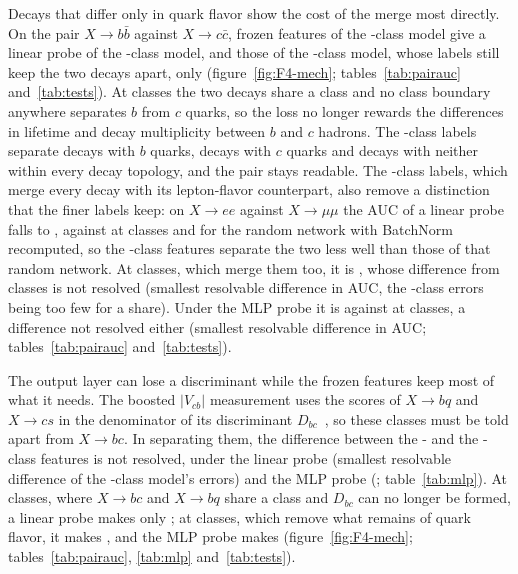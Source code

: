 Decays that differ only in quark flavor show the cost of the merge most directly. On the pair
$X\to b\bar b$ against $X\to c\bar c$, frozen features of the \Kcoarse-class model give a linear probe
\MlstCmpBbCoarseOverFullPr{} of the \Kfull-class model, and those of the \Kmid-class model, whose labels still
keep the two decays apart, only \MlstCmpBbMidOverFullPr{} (figure~\ref{fig:F4-mech}; tables~\ref{tab:pairauc} and~\ref{tab:tests}). At
\Kcoarse{} classes the two decays share a class and no class boundary anywhere separates $b$ from $c$ quarks, so
the loss no longer rewards the differences in lifetime and decay multiplicity between $b$ and $c$ hadrons. The
\Kmid-class labels separate decays with $b$ quarks, decays with $c$ quarks and decays with neither within every
decay topology, and the pair stays readable.
The \Kmid-class labels, which merge every decay with its lepton-flavor counterpart, also remove a distinction
that the finer labels keep: on $X\to ee$ against $X\to\mu\mu$ the AUC of a linear probe falls to
\MlstLpEemmAucMid{}, against \MlstLpEemmAucFull{} at \Kfull{} classes and \MlstLpEemmAucInitBn{} for the
random network with BatchNorm recomputed, so the \Kmid-class features separate the two less well than those of that
random network. At \Kcoarse{} classes, which merge them too, it is \MlstLpEemmAucCoarse{},
whose difference from \Kfull{} classes is not resolved (smallest resolvable difference \MlstPwEeCoarse{} in AUC,
the \Kfull-class errors being too few for a share). Under the MLP probe it is \MlstMlpEemmAucCoarse{} against
\MlstMlpEemmAucFull{} at \Kfull{} classes, a difference not resolved either (smallest resolvable difference
\MlstPwEeCoarseMlp{} in AUC; tables~\ref{tab:pairauc} and~\ref{tab:tests}).

The output layer can lose a discriminant while the frozen features keep most of what it needs. The
boosted $|V_{cb}|$ measurement uses the scores of $X\to bq$ and $X\to cs$ in the denominator of its
discriminant $D_{bc}$~\cite{vcbboosted}, so these classes must be told apart from $X\to bc$. In separating
them, the difference between the \Kres- and the \Kfull-class features is not resolved, under the linear probe
(smallest resolvable difference \MlstPwBcRes{} of the \Kfull-class model's errors) and the MLP probe (\MlstMlpCmpBcResOverFullPr{}; table~\ref{tab:mlp}). At \Kmid{}
classes, where $X\to bc$ and $X\to bq$ share a class and $D_{bc}$ can no longer be formed, a linear probe makes
only \MlstCmpBcMidOverFullPr{}; at \Kcoarse{} classes, which remove what remains of quark flavor, it makes
\MlstCmpBcCoarseOverFullPr{}, and the MLP probe makes \MlstMlpCmpBcCoarseOverFullPr{} (figure~\ref{fig:F4-mech};
tables~\ref{tab:pairauc}, \ref{tab:mlp} and~\ref{tab:tests}).

